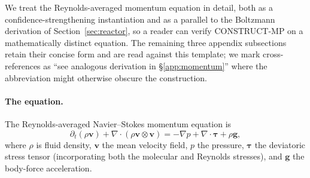 We treat the Reynolds-averaged momentum equation in detail, both as a confidence-strengthening instantiation and as a parallel to the Boltzmann derivation of Section~\ref{sec:reactor}, so a reader can verify CONSTRUCT-MP on a mathematically distinct equation. The remaining three appendix subsections retain their concise form and are read against this template; we mark cross-references as ``see analogous derivation in \S\ref{app:momentum}'' where the abbreviation might otherwise obscure the construction.

\paragraph{The equation.} The Reynolds-averaged Navier--Stokes momentum equation is
\begin{equation}
\partial_t (\rho \mathbf{v}) + \nabla\!\cdot\!(\rho \mathbf{v}\otimes\mathbf{v}) = -\nabla p + \nabla\!\cdot\!\boldsymbol{\tau} + \rho\mathbf{g},
\label{eq:rans}
\end{equation}
where $\rho$ is fluid density, $\mathbf{v}$ the mean velocity field, $p$ the pressure, $\boldsymbol{\tau}$ the deviatoric stress tensor (incorporating both the molecular and Reynolds stresses), and $\mathbf{g}$ the body-force acceleration.

